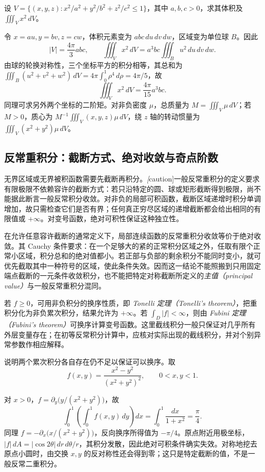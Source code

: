 \begin{example}
\label{ex:pei-ellipsoid-moment}
设 $V=\{(x,y,z):x^2/a^2+y^2/b^2+z^2/c^2\le1\}$，其中 $a,b,c>0$，求其体积及 $\iiint_Vx^2\,dV$。
\end{example}
\begin{solve}
令 $x=au,y=bv,z=cw$，体积元素变为 $abc\,du\,dv\,dw$，区域变为单位球 $B$。因此
\[
|V|=\frac{4\pi}3abc,
\qquad
\iiint_Vx^2\,dV=a^3bc\iiint_Bu^2\,du\,dv\,dw.
\]
由球的轮换对称性，三个坐标平方的积分相等，其总和为
$\iiint_B(u^2+v^2+w^2)\,dV=4\pi\int_0^1\rho^4\,d\rho=4\pi/5$，故
\[
\iiint_Vx^2\,dV=\frac{4\pi}{15}a^3bc.
\]
同理可求另外两个坐标的二阶矩。对非负密度 $\mu$，总质量为 $M=\iiint_V\mu\,dV$；若 $M>0$，质心为 $M^{-1}\iiint_V(x,y,z)\mu\,dV$，绕 $z$ 轴的转动惯量为 $\iiint_V(x^2+y^2)\mu\,dV$。
\end{solve}

\subsection{反常重积分：截断方式、绝对收敛与奇点阶数}

无界区域或无界被积函数需要先截断再积分。\emph[caution]{一般反常重积分的定义要求有限极限不依赖容许的截断方式}：若只沿特定的圆、球或矩形截断得到极限，尚不能据此断言一般反常积分收敛。对非负的局部可积函数，截断区域递增时积分单调增加，故只需检查它们是否有界；任何真正穷尽区域的递增截断都会给出相同的有限值或 $+\infty$。对变号函数，绝对可积性保证这种独立性。

在允许任意容许截断的通常定义下，局部连续函数的反常重积分收敛等价于绝对收敛。其 Cauchy 条件要求：在一个足够大的紧的正常积分区域之外，任取有限个正常小区域，积分总和的绝对值都小。若正部与负部的剩余积分不能同时变小，就可优先截取其中一种符号的区域，使此条件失效。因而这一结论不能照搬到只用固定端点截断的一元条件收敛积分，也不能把特定对称截断所定义的\emph{主值（principal value）}与一般反常重积分混同。

若 $f\ge0$，可用非负积分的换序性质，即 \emph{Tonelli 定理（Tonelli's theorem）}，把重积分化为非负累次积分，结果允许为 $+\infty$。若 $\int_D|f|<\infty$，则由 \emph{Fubini 定理（Fubini's theorem）}可换序计算变号函数。这里截线积分一般只保证对几乎所有外层变量存在；在初等反常积分计算中，应核对实际出现的截线积分，并对个别异常参数作相应解释。

\begin{example}
\label{ex:pei-fubini-failure}
说明两个累次积分各自存在仍不足以保证可以换序。取
\[
f(x,y)=\frac{x^2-y^2}{(x^2+y^2)^2},\qquad 0<x,y<1.
\]
\end{example}
\begin{solve}
对 $x>0$，$f=\partial_y\bigl(y/(x^2+y^2)\bigr)$，故
\[
\int_0^1\!\left(\int_0^1f(x,y)\,dy\right)dx
=\int_0^1\frac{dx}{1+x^2}=\frac\pi4.
\]
同理 $f=-\partial_x\bigl(x/(x^2+y^2)\bigr)$，反向换序所得值为 $-\pi/4$。原点附近用极坐标，$|f|\,dA=|\cos2\theta|\,dr\,d\theta/r$，其积分发散，因此绝对可积条件确实失效。对称地挖去原点小圆时，由交换 $x,y$ 的反对称性还会得到零；这只是特定截断的值，不是一般反常二重积分。
\end{solve}

